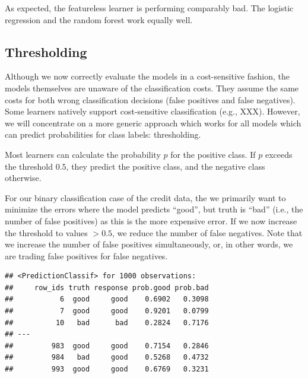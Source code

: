 \documentclass[
]{scrbook}
\newenvironment{Shaded}{\begin{snugshade}}{\end{snugshade}}
\newcommand{\AttributeTok}[1]{\textcolor[rgb]{0.77,0.63,0.00}{#1}}
\newcommand{\CommentTok}[1]{\textcolor[rgb]{0.56,0.35,0.01}{\textit{#1}}}
\newcommand{\FunctionTok}[1]{\textcolor[rgb]{0.00,0.00,0.00}{#1}}
\newcommand{\NormalTok}[1]{#1}
\newcommand{\OtherTok}[1]{\textcolor[rgb]{0.56,0.35,0.01}{#1}}
\newcommand{\SpecialCharTok}[1]{\textcolor[rgb]{0.00,0.00,0.00}{#1}}
\newcommand{\StringTok}[1]{\textcolor[rgb]{0.31,0.60,0.02}{#1}}
\renewenvironment{Shaded} {\begin{snugshade}\small} {\end{snugshade}}
\begin{document}
As expected, the featureless learner is performing comparably bad.
The logistic regression and the random forest work equally well.

\hypertarget{thresholding}{%
\subsection{Thresholding}\label{thresholding}}

Although we now correctly evaluate the models in a cost-sensitive fashion, the models themselves are unaware of the classification costs.
They assume the same costs for both wrong classification decisions (false positives and false negatives).
Some learners natively support cost-sensitive classification (e.g., XXX).
However, we will concentrate on a more generic approach which works for all models which can predict probabilities for class labels: thresholding.

Most learners can calculate the probability \(p\) for the positive class.
If \(p\) exceeds the threshold \(0.5\), they predict the positive class, and the negative class otherwise.

For our binary classification case of the credit data, the we primarily want to minimize the errors where the model predicts ``good'', but truth is ``bad'' (i.e., the number of false positives) as this is the more expensive error.
If we now increase the threshold to values \(> 0.5\), we reduce the number of false negatives.
Note that we increase the number of false positives simultaneously, or, in other words, we are trading false positives for false negatives.

\begin{Shaded}
\end{Shaded}

\begin{verbatim}
## <PredictionClassif> for 1000 observations:
##     row_ids truth response prob.good prob.bad
##           6  good     good    0.6902   0.3098
##           7  good     good    0.9201   0.0799
##          10   bad      bad    0.2824   0.7176
## ---                                          
##         983  good     good    0.7154   0.2846
##         984   bad     good    0.5268   0.4732
##         993  good     good    0.6769   0.3231
\end{verbatim}
\end{document}
